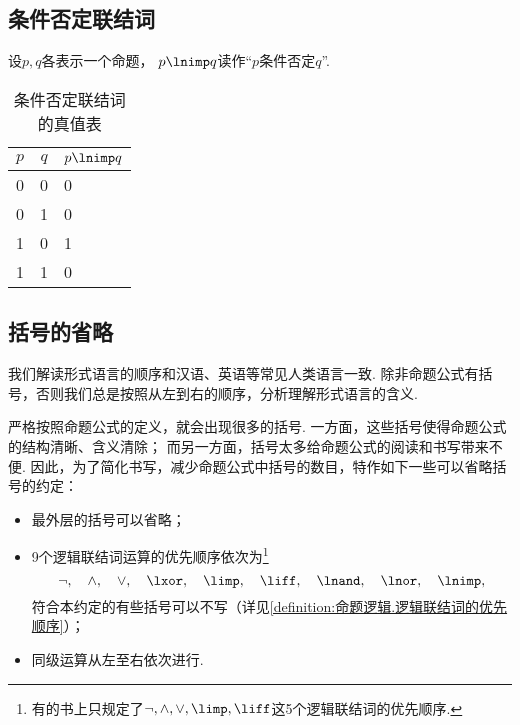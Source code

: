 \subsection{条件否定联结词}
设\(p,q\)各表示一个命题，
\(p \lnimp q\)读作“\(p\)条件否定\(q\)”.

\begin{table}[ht]
	\centering
	\begin{tabular}{|*{2}{c|}p{2cm}|}
		\hline
		\(p\) & \(q\) & \(p \lnimp q\) \\
		\hline
		0 & 0 & 0 \\
		0 & 1 & 0 \\
		1 & 0 & 1 \\
		1 & 1 & 0 \\
		\hline
	\end{tabular}
	\caption{条件否定联结词的真值表}
\end{table}

\subsection{括号的省略}
我们解读形式语言的顺序和汉语、英语等常见人类语言一致.
除非命题公式有括号，否则我们总是按照从左到右的顺序，分析理解形式语言的含义.

严格按照命题公式的定义，就会出现很多的括号.
一方面，这些括号使得命题公式的结构清晰、含义清除；
而另一方面，括号太多给命题公式的阅读和书写带来不便.
因此，为了简化书写，减少命题公式中括号的数目，特作如下一些可以省略括号的约定：\begin{itemize}
	\item 最外层的括号可以省略；
	\item 9个逻辑联结词运算的优先顺序依次为\footnote{
		有的书上只规定了\(\neg,\land,\lor,\limp,\liff\)这5个逻辑联结词的优先顺序.
	}\begin{equation*}
		\neg, \quad
		\land, \quad
		\lor, \quad
		\lxor, \quad
		\limp, \quad
		\liff, \quad
		\lnand, \quad
		\lnor, \quad
		\lnimp,
	\end{equation*}
	符合本约定的有些括号可以不写（详见\cref{definition:命题逻辑.逻辑联结词的优先顺序}）；
	\item 同级运算从左至右依次进行.
\end{itemize}

